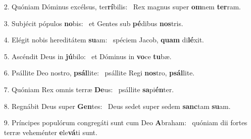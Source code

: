 2. Quóniam Dóminus excélsus, ter\textbf{rí}bilis: \ast\  Rex magnus super \textbf{om}nem \textbf{ter}ram.\

3. Subjécit pópulos \textbf{no}bis: \ast\  et Gentes sub \textbf{pé}dibus \textbf{nos}tris.\

4. Elégit nobis hereditátem \textbf{su}am: \ast\  spéciem Jacob, \textbf{quam} di\textbf{lé}xit.\

5. Ascéndit Deus in \textbf{jú}bilo: \ast\  et Dóminus in \textbf{vo}ce \textbf{tu}bæ.\

6. Psállite Deo nostro, \textbf{psál}lite: \ast\  psállite Regi \textbf{nos}tro, \textbf{psál}lite.\

7. Quóniam Rex omnis terræ \textbf{De}us: \ast\  psállite \textbf{sa}pi\textbf{én}ter.\

8. Regnábit Deus super \textbf{Gen}tes: \ast\  Deus sedet super sedem \textbf{sanc}tam \textbf{su}am.\

9. Príncipes populórum congregáti sunt cum Deo \textbf{A}braham: \ast\  quóniam dii fortes terræ veheménter \textbf{e}le\textbf{vá}ti sunt.\

